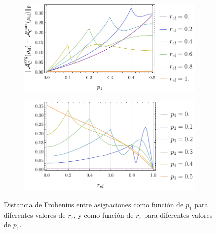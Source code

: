 \begin{figure}[ht!]
    \centering
    \begin{subfigure}{0.5\textwidth}
      \centering
      \includegraphics[width=1.\linewidth]{chapter5/figures/dist_maxent_avg_vs_p.pdf}
    \end{subfigure}%
    \begin{subfigure}{0.5\textwidth}
      \centering
      \includegraphics[width=1.\linewidth]{chapter5/figures/dist_maxent_avg_vs_z.pdf}
    \end{subfigure}
    \caption{Distancia de Frobenius entre asignaciones como función de $p_{1}$ para diferentes valores de $r_{z}$, y como función de $r_{z}$ para diferentes valores de $p_{1}$.}\label{ap:DistAvgMaxEnt}
\end{figure}

